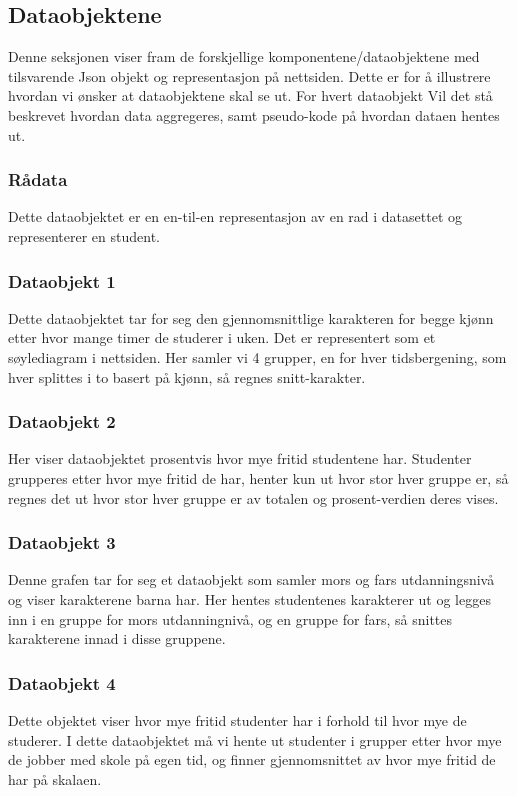 \subsection{Dataobjektene}
Denne seksjonen viser fram de forskjellige komponentene/dataobjektene med tilsvarende Json objekt og representasjon på nettsiden. Dette er for å illustrere hvordan vi ønsker at dataobjektene skal se ut. For hvert dataobjekt Vil det stå beskrevet hvordan data aggregeres, samt pseudo-kode på hvordan dataen hentes ut.

\subsubsection{Rådata}
Dette dataobjektet er en en-til-en representasjon av en rad i datasettet og representerer en student.

\subsubsection{Dataobjekt 1}
Dette dataobjektet tar for seg den gjennomsnittlige karakteren for begge kjønn etter hvor mange timer de studerer i uken. Det er representert som et søylediagram i nettsiden. Her samler vi 4 grupper, en for hver tidsbergening, som hver splittes i to basert på kjønn, så regnes snitt-karakter.

\subsubsection{Dataobjekt 2}
Her viser dataobjektet prosentvis hvor mye fritid studentene har. Studenter grupperes etter hvor mye fritid de har, henter kun ut hvor stor hver gruppe er, så regnes 
det ut hvor stor hver gruppe er av totalen og prosent-verdien deres vises.

\subsubsection{Dataobjekt 3}
Denne grafen tar for seg et dataobjekt som samler mors og fars utdanningsnivå og viser karakterene barna har. Her hentes studentenes karakterer ut og legges inn i en gruppe for mors utdanningnivå, og en gruppe for fars, så snittes karakterene innad i disse gruppene.

\subsubsection{Dataobjekt 4}
Dette objektet viser hvor mye fritid studenter har i forhold til hvor mye de studerer. I dette dataobjektet må vi hente ut studenter i grupper etter hvor mye de jobber med skole på egen tid, og finner gjennomsnittet av hvor mye fritid de har på skalaen.

